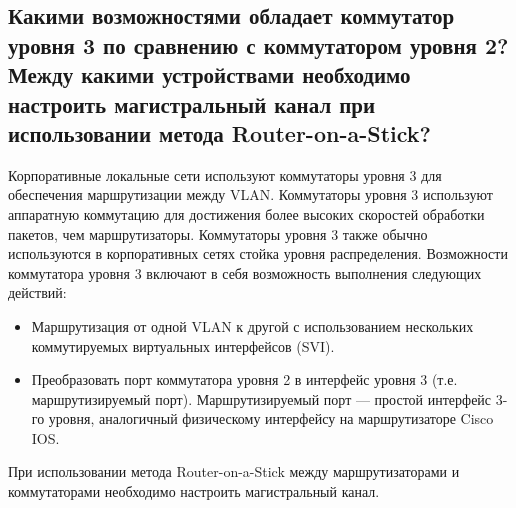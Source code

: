 \subsection{Какими возможностями обладает коммутатор уровня 3 по сравнению с коммутатором уровня 2?
Между какими устройствами необходимо настроить магистральный канал при использовании метода
Router-on-a-Stick? }

Корпоративные локальные сети используют коммутаторы уровня 3 для
обеспечения маршрутизации между VLAN. Коммутаторы уровня 3
используют аппаратную коммутацию для достижения более высоких
скоростей обработки пакетов, чем маршрутизаторы. Коммутаторы уровня 3
также обычно используются в корпоративных сетях стойка уровня
распределения.
Возможности коммутатора уровня 3 включают в себя возможность
выполнения следующих действий:

\begin{itemize}
    \item Маршрутизация от одной VLAN к другой с использованием
    нескольких коммутируемых виртуальных интерфейсов (SVI).
    \item Преобразовать порт коммутатора уровня 2 в интерфейс уровня 3
    (т.е. маршрутизируемый порт). Маршрутизируемый порт —
    простой интерфейс 3-го уровня, аналогичный физическому
    интерфейсу на маршрутизаторе Cisco IOS.
\end{itemize}

При использовании метода Router-on-a-Stick между маршрутизаторами
и коммутаторами необходимо настроить магистральный канал.